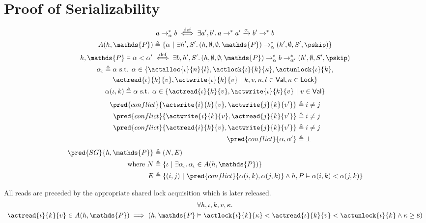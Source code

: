 \section{Proof of Serializability}

\begin{gather*}
a \rightarrow^*_\alpha b \overset{\text{def}}{\iff} \exists a', b' \ldotp a \rightarrow^* a' \xrightarrow{\alpha} b' \rightarrow^* b
\\
A(h, \mathds{P}) \triangleq \{ \alpha\ |\ \exists h', S' \ldotp (h, \emptyset, \emptyset, \mathds{P}) \rightarrow_\alpha^* (h', \emptyset, S', \pskip) \}
\\
h, \mathds{P} \vDash \alpha < \alpha' \overset{\text{def}}{\iff} \exists b, h', S' \ldotp (h, \emptyset, \emptyset, \mathds{P}) \rightarrow_\alpha^* b \rightarrow^*_{\alpha'} (h', \emptyset, S', \pskip)
\\
\alpha_\iota \triangleq \alpha \text{ s.t. } \alpha \in \{ \actalloc{\iota}{n}{l}, \actlock{\iota}{k}{\kappa}, \actunlock{\iota}{k}, \\ \actread{\iota}{k}{v}, \actwrite{\iota}{k}{v}\ |\ k, v, n, l \in \mathsf{Val}, \kappa \in \mathsf{Lock} \}
\\
\alpha(\iota, k) \triangleq \alpha \text{ s.t. } \alpha \in \{ \actread{\iota}{k}{v}, \actwrite{\iota}{k}{v}\ |\ v \in \mathsf{Val} \}
\end{gather*}
\begin{align*}
\pred{conflict}{\actwrite{i}{k}{v}, \actwrite{j}{k}{v'}} &\triangleq i \neq j
\\
\pred{conflict}{\actwrite{i}{k}{v}, \actread{j}{k}{v'}} &\triangleq i \neq j
\\
\pred{conflict}{\actread{i}{k}{v}, \actwrite{j}{k}{v'}} &\triangleq i \neq j
\\
\pred{conflict}{\alpha, \alpha'} &\triangleq \bot 
\end{align*}
\begin{align*}
\pred{SG}{h, \mathds{P}} &\triangleq (N, E) \\
\text{where } N &\triangleq \{ \iota\ |\ \exists \alpha_\iota \ldotp \alpha_\iota \in A(h, \mathds{P}) \} \\
E &\triangleq \{ (i, j)\ |\ \pred{conflict}{\alpha(i, k), \alpha(j, k)} \land h, P \vDash \alpha(i, k) < \alpha(j, k) \}
\end{align*}

\lem \label{lem:read} All reads are preceded by the appropriate shared lock acquisition which is later released.
\begin{gather*}
\forall h, \iota, k, v, \kappa \ldotp \\
\actread{\iota}{k}{v} \in A(h, \mathds{P}) \implies \left( h, \mathds{P} \vDash \actlock{\iota}{k}{\kappa} < \actread{\iota}{k}{v} < \actunlock{\iota}{k} \land \kappa \geq \textsc{s} \right)
\end{gather*}

